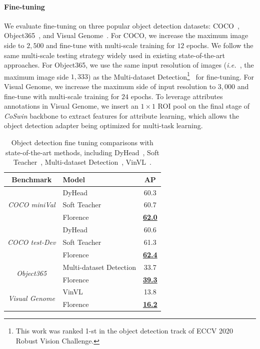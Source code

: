 \documentclass{article}
\newcommand{\ie}{{\it{i.e.}~}}
\begin{document}
\paragraph{Fine-tuning} We evaluate fine-tuning on three popular object detection datasets:
COCO~\cite{lin2015microsoft}, Object365~\cite{Shao_2019_ICCV}, and Visual
Genome~\cite{krishnavisualgenome}. For COCO, we increase the maximum image side to $2,500$ and
fine-tune with multi-scale training for $12$ epochs. We follow the same multi-scale testing strategy
widely used in existing state-of-the-art approaches. For Object365, we use the same input resolution
of images (\ie, the maximum image side $1,333$) as the Multi-dataset Detection\footnote{This work was ranked 1-st
in the object detection track of ECCV 2020 Robust Vision Challenge.}~\cite{zhou2021simple} for
fine-tuning. For Visual Genome, we increase the maximum side of input resolution to $3,000$ and
fine-tune with multi-scale training for $24$ epochs. To leverage attributes annotations in Visual
Genome, we insert an $1\times1$ ROI pool on the final stage of \emph{CoSwin} backbone to extract
features for attribute learning, which allows the object detection adapter being optimized for multi-task
learning.


\begin{table}[t]
\centering
\setlength{\tabcolsep}{12.5pt}
\small
\renewcommand{\arraystretch}{1.35}
\begin{tabular}{c|l|c}
\toprule
Benchmark & Model & AP  \\ \midrule
\multirow{3}{*}{\it{COCO miniVal}} & DyHead & 60.3 \\
& Soft Teacher & 60.7 \\
& Florence & \underline{\bf{62.0}} \\ \midrule
\multirow{3}{*}{\it{COCO test-Dev}} & DyHead & 60.6 \\
& Soft Teacher & 61.3 \\
& Florence & \underline{\bf{62.4}} \\ \midrule
\multirow{2}{*}{\it{Object365}} & Multi-dataset Detection & 33.7 \\
& Florence & \underline{\bf{39.3}} \\ \midrule
\multirow{2}{*}{\it{Visual Genome}} & VinVL & 13.8 \\
& Florence & \underline{\bf{16.2}} \\
\bottomrule
\end{tabular}
\caption{Object detection fine tuning comparisons with state-of-the-art methods, including DyHead~\cite{Dai_2021_CVPR}, Soft Teacher~\cite{Xu_2021_ICCV}, Multi-dataset Detection~\cite{zhou2021simple}, VinVL~\cite{Zhang_2021_CVPR}.}
\label{tab:od_result}
\end{table}
\end{document}
